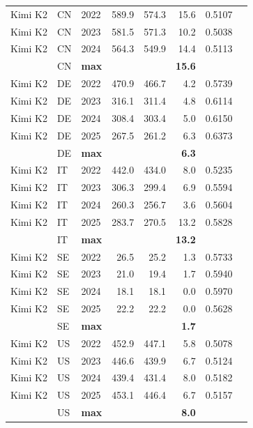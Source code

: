 \begin{tabular}{lllrrrrr}
\midrule
Kimi K2 & CN & 2022 & 589.9 & 574.3 & 15.6 & 0.5107 \\
Kimi K2 & CN & 2023 & 581.5 & 571.3 & 10.2 & 0.5038 \\
Kimi K2 & CN & 2024 & 564.3 & 549.9 & 14.4 & 0.5113 \\
 & CN & \textbf{max} & & & \textbf{15.6} & \\
\midrule
Kimi K2 & DE & 2022 & 470.9 & 466.7 & 4.2 & 0.5739 \\
Kimi K2 & DE & 2023 & 316.1 & 311.4 & 4.8 & 0.6114 \\
Kimi K2 & DE & 2024 & 308.4 & 303.4 & 5.0 & 0.6150 \\
Kimi K2 & DE & 2025 & 267.5 & 261.2 & 6.3 & 0.6373 \\
 & DE & \textbf{max} & & & \textbf{6.3} & \\
\midrule
Kimi K2 & IT & 2022 & 442.0 & 434.0 & 8.0 & 0.5235 \\
Kimi K2 & IT & 2023 & 306.3 & 299.4 & 6.9 & 0.5594 \\
Kimi K2 & IT & 2024 & 260.3 & 256.7 & 3.6 & 0.5604 \\
Kimi K2 & IT & 2025 & 283.7 & 270.5 & 13.2 & 0.5828 \\
 & IT & \textbf{max} & & & \textbf{13.2} & \\
\midrule
Kimi K2 & SE & 2022 & 26.5 & 25.2 & 1.3 & 0.5733 \\
Kimi K2 & SE & 2023 & 21.0 & 19.4 & 1.7 & 0.5940 \\
Kimi K2 & SE & 2024 & 18.1 & 18.1 & 0.0 & 0.5970 \\
Kimi K2 & SE & 2025 & 22.2 & 22.2 & 0.0 & 0.5628 \\
 & SE & \textbf{max} & & & \textbf{1.7} & \\
\midrule
Kimi K2 & US & 2022 & 452.9 & 447.1 & 5.8 & 0.5078 \\
Kimi K2 & US & 2023 & 446.6 & 439.9 & 6.7 & 0.5124 \\
Kimi K2 & US & 2024 & 439.4 & 431.4 & 8.0 & 0.5182 \\
Kimi K2 & US & 2025 & 453.1 & 446.4 & 6.7 & 0.5157 \\
 & US & \textbf{max} & & & \textbf{8.0} & \\
\midrule
\bottomrule
\end{tabular}
